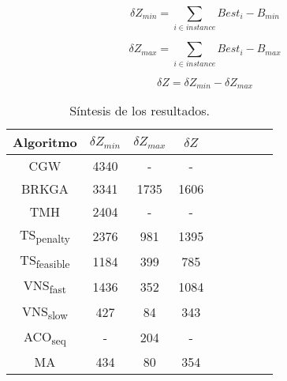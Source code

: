 \bigskip

\begin{equation} \label{eq:zMin}
\delta Z_{min} = \sum_{i \in instance} Best_i - B_{min}
\end{equation}

\begin{equation} \label{eq:zMax}
\delta Z_{max} = \sum_{i \in instance} Best_i - B_{max}
\end{equation}

\begin{equation} \label{eq:DeltaZ}
\delta Z = \delta Z_{min} - \delta Z_{max}
\end{equation}

\bigskip

\begin{table}[!htbp]
\begin{center}
\begin{tabular}{ |c|c|c|c|c|c|c|c|c| } 
\hline
Algoritmo & $\delta Z_{min}$ & $\delta Z_{max}$ & $\delta Z$  \\
\hline
CGW & 4340 & - & -  \\
BRKGA & 3341 & 1735 & 1606  \\
TMH & 2404 & - & -  \\
TS\textsubscript{penalty} & 2376 & 981 & 1395  \\
TS\textsubscript{feasible} & 1184 & 399 & 785  \\
VNS\textsubscript{fast} & 1436 & 352 & 1084  \\
VNS\textsubscript{slow} & 427 & 84 & 343  \\
ACO\textsubscript{seq} & - & 204 & -  \\
MA & 434 & 80 & 354  \\
\hline
\end{tabular}
\end{center}
\caption{Síntesis de los resultados.}
\label{tab:resultadosSintesis}
\end{table}

\bigskip

